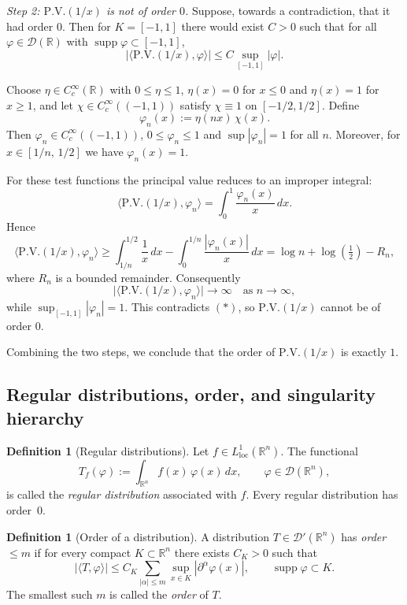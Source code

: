 \documentclass[12pt,a4paper]{article}
\theoremstyle{plain}
\theoremstyle{definition}
\newtheorem{definition}[theorem]{Definition}
\theoremstyle{remark}
\theoremstyle{remark}
\begin{document}
	\emph{Step 2: $\mathrm{P.V.}(1/x)$ is not of order $0$.}
	Suppose, towards a contradiction, that it had order $0$.  Then for
	$K=[-1,1]$ there would exist $C>0$ such that for all
	$\varphi\in\mathcal{D}(\mathbb{R})$ with
	$\operatorname{supp}\varphi\subset[-1,1]$,
	\[
	\left|\bigl\langle \mathrm{P.V.}(1/x), \varphi \bigr\rangle\right|
	\le C\sup_{[-1,1]}|\varphi|.
	\tag{$*$}
	\]
	
	Choose $\eta\in C_c^\infty(\mathbb{R})$ with $0\le\eta\le1$,
	$\eta(x)=0$ for $x\le0$ and $\eta(x)=1$ for $x\ge1$, and let
	$\chi\in C_c^\infty((-1,1))$ satisfy $\chi\equiv1$ on $[-1/2,1/2]$.
	Define
	\[
	\varphi_n(x) := \eta(nx)\,\chi(x).
	\]
	Then $\varphi_n\in C_c^\infty((-1,1))$, $0\le\varphi_n\le1$ and
	$\sup|\varphi_n|=1$ for all $n$.  Moreover, for $x\in[1/n,\,1/2]$ we
	have $\varphi_n(x)=1$.
	
	For these test functions the principal value reduces to an improper
	integral:
	\[
	\bigl\langle \mathrm{P.V.}(1/x), \varphi_n \bigr\rangle
	= \int_{0}^{1} \frac{\varphi_n(x)}{x}\,dx.
	\]
	Hence
	\[
	\bigl\langle \mathrm{P.V.}(1/x), \varphi_n \bigr\rangle
	\ge \int_{1/n}^{1/2} \frac{1}{x}\,dx - \int_{0}^{1/n}\frac{|\varphi_n(x)|}{x}\,dx
	= \log n + \log\!\left(\tfrac12\right) - R_n,
	\]
	where $R_n$ is a bounded remainder.  Consequently
	\[
	\bigl|\bigl\langle \mathrm{P.V.}(1/x), \varphi_n \bigr\rangle\bigr|
	\to \infty \quad\text{as } n\to\infty,
	\]
	while $\sup_{[-1,1]}|\varphi_n|=1$.  This contradicts $(*)$, so
	$\mathrm{P.V.}(1/x)$ cannot be of order $0$.
	
	Combining the two steps, we conclude that the order of
	$\mathrm{P.V.}(1/x)$ is exactly $1$.




\subsection*{Regular distributions, order, and singularity hierarchy}

\begin{definition}[Regular distributions]
	Let $f\in L^1_{\mathrm{loc}}(\mathbb{R}^n)$.  
	The functional
	\[
	T_f(\varphi)
	:= \int_{\mathbb{R}^n} f(x)\,\varphi(x)\,dx,
	\qquad \varphi\in\mathcal{D}(\mathbb{R}^n),
	\]
	is called the \emph{regular distribution} associated with $f$.  
	Every regular distribution has order~$0$.
\end{definition}

\begin{definition}[Order of a distribution]
	A distribution $T\in\mathcal{D}'(\mathbb{R}^n)$ has \emph{order $\le m$}
	if for every compact $K\subset\mathbb{R}^n$ there exists $C_K>0$ such that
	\[
	|\langle T, \varphi\rangle|
	\le C_K \sum_{|\alpha|\le m} \sup_{x\in K}
	\left| \partial^\alpha \varphi(x) \right|,
	\qquad \operatorname{supp}\varphi\subset K.
	\]
	The smallest such $m$ is called the \emph{order} of $T$.
\end{definition}
\end{document}
